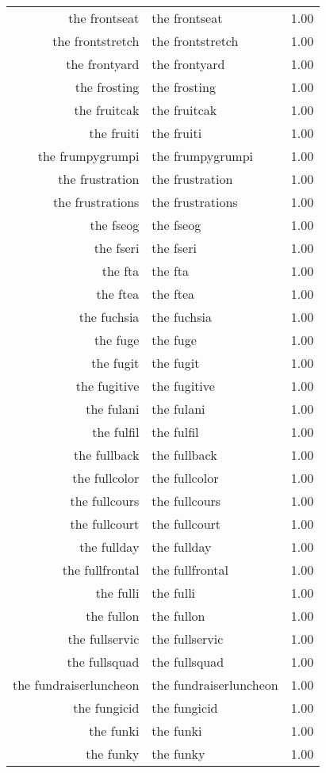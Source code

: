 \begin{table}[ht]
\begin{tabular}{rlr}
  the frontseat & the frontseat & 1.00 \\ 
  the frontstretch & the frontstretch & 1.00 \\ 
  the frontyard & the frontyard & 1.00 \\ 
  the frosting & the frosting & 1.00 \\ 
  the fruitcak & the fruitcak & 1.00 \\ 
  the fruiti & the fruiti & 1.00 \\ 
  the frumpygrumpi & the frumpygrumpi & 1.00 \\ 
  the frustration & the frustration & 1.00 \\ 
  the frustrations & the frustrations & 1.00 \\ 
  the fseog & the fseog & 1.00 \\ 
  the fseri & the fseri & 1.00 \\ 
  the fta & the fta & 1.00 \\ 
  the ftea & the ftea & 1.00 \\ 
  the fuchsia & the fuchsia & 1.00 \\ 
  the fuge & the fuge & 1.00 \\ 
  the fugit & the fugit & 1.00 \\ 
  the fugitive & the fugitive & 1.00 \\ 
  the fulani & the fulani & 1.00 \\ 
  the fulfil & the fulfil & 1.00 \\ 
  the fullback & the fullback & 1.00 \\ 
  the fullcolor & the fullcolor & 1.00 \\ 
  the fullcours & the fullcours & 1.00 \\ 
  the fullcourt & the fullcourt & 1.00 \\ 
  the fullday & the fullday & 1.00 \\ 
  the fullfrontal & the fullfrontal & 1.00 \\ 
  the fulli & the fulli & 1.00 \\ 
  the fullon & the fullon & 1.00 \\ 
  the fullservic & the fullservic & 1.00 \\ 
  the fullsquad & the fullsquad & 1.00 \\ 
  the fundraiserluncheon & the fundraiserluncheon & 1.00 \\ 
  the fungicid & the fungicid & 1.00 \\ 
  the funki & the funki & 1.00 \\ 
  the funky & the funky & 1.00 \\ 

\end{tabular}
\end{table}
